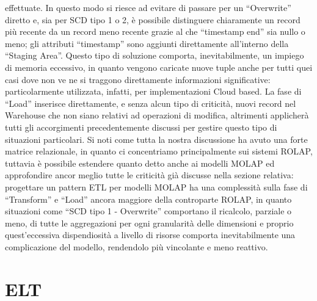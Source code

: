 \documentclass[a4paper,12pt]{report}
\begin{document}
effettuate. In questo modo si riesce ad evitare di passare per un “Overwrite” diretto e, sia per SCD tipo 1 o 2, è possibile distinguere chiaramente un record più recente da un record meno recente grazie al che “timestamp end” sia nullo o meno; gli attributi “timestamp” sono aggiunti direttamente all’interno della “Staging Area”. Questo tipo di soluzione comporta, inevitabilmente, un impiego di memoria eccessivo, in quanto vengono caricate nuove tuple anche per tutti quei casi dove non ve ne si traggono direttamente informazioni significative: particolarmente utilizzata, infatti, per implementazioni Cloud based. La fase di “Load” inserisce direttamente, e senza alcun tipo di criticità, nuovi record nel Warehouse che non siano relativi ad operazioni di modifica, altrimenti applicherà tutti gli accorgimenti precedentemente discussi per gestire questo tipo di situazioni particolari. 
Si noti come tutta la nostra discussione ha avuto una forte matrice relazionale, in quanto ci concentriamo principalmente sui sistemi ROLAP, tuttavia è possibile estendere quanto detto anche ai modelli MOLAP ed approfondire ancor meglio tutte le criticità già discusse nella sezione relativa: progettare un pattern ETL per modelli MOLAP ha una complessità sulla fase di “Transform” e “Load” ancora maggiore della controparte ROLAP, in quanto situazioni come “SCD tipo 1 - Overwrite” comportano il ricalcolo, parziale o meno, di tutte le aggregazioni per ogni granularità delle dimensioni e proprio quest’eccessiva dispendiosità a livello di risorse comporta inevitabilmente una complicazione del modello, rendendolo più vincolante e meno reattivo.

\section{ELT}
\end{document}
